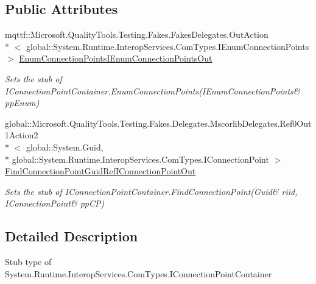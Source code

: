 \subsection*{Public Attributes}
\begin{DoxyCompactItemize}
\item 
mqttf\-::\-Microsoft.\-Quality\-Tools.\-Testing.\-Fakes.\-Fakes\-Delegates.\-Out\-Action\\*
$<$ global\-::\-System.\-Runtime.\-Interop\-Services.\-Com\-Types.\-I\-Enum\-Connection\-Points $>$ \hyperlink{class_system_1_1_runtime_1_1_interop_services_1_1_com_types_1_1_fakes_1_1_stub_i_connection_point_container_a806d4cd6d562ad172c28c9a7ce199e87}{Enum\-Connection\-Points\-I\-Enum\-Connection\-Points\-Out}
\begin{DoxyCompactList}\small\item\em Sets the stub of I\-Connection\-Point\-Container.\-Enum\-Connection\-Points(I\-Enum\-Connection\-Points\& pp\-Enum)\end{DoxyCompactList}\item 
global\-::\-Microsoft.\-Quality\-Tools.\-Testing.\-Fakes.\-Delegates.\-Mscorlib\-Delegates.\-Ref0\-Out1\-Action2\\*
$<$ global\-::\-System.\-Guid, \\*
global\-::\-System.\-Runtime.\-Interop\-Services.\-Com\-Types.\-I\-Connection\-Point $>$ \hyperlink{class_system_1_1_runtime_1_1_interop_services_1_1_com_types_1_1_fakes_1_1_stub_i_connection_point_container_a03a7ef2ae9962aab07b9c33bacbaf873}{Find\-Connection\-Point\-Guid\-Ref\-I\-Connection\-Point\-Out}
\begin{DoxyCompactList}\small\item\em Sets the stub of I\-Connection\-Point\-Container.\-Find\-Connection\-Point(Guid\& riid, I\-Connection\-Point\& pp\-C\-P)\end{DoxyCompactList}\end{DoxyCompactItemize}


\subsection{Detailed Description}
Stub type of System.\-Runtime.\-Interop\-Services.\-Com\-Types.\-I\-Connection\-Point\-Container



